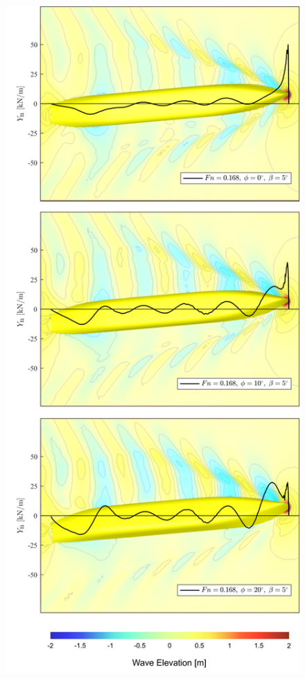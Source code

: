 \documentclass[twoside,twocolumn]{article}
\begin{document}
\begin{figure}[!h]
	\centering
	\includegraphics[width=1.1\columnwidth]{images/wavesphi.png}  %

\end{figure}
\end{document}
